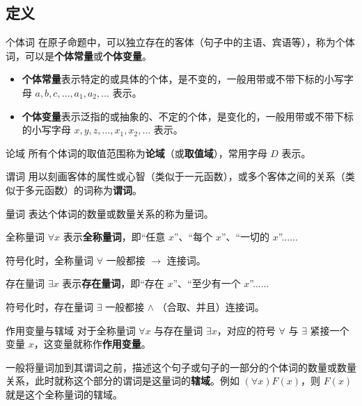 

\subsection{定义}
\begin{definition}{个体词}
在原子命题中，可以独立存在的客体（句子中的主语、宾语等），称为个体词，可以是\textbf{个体常量}或\textbf{个体变量}。
\begin{itemize}
\item \textbf{个体常量}表示特定的或具体的个体，是不变的，一般用带或不带下标的小写字母 $a, b, c, \dots, a_1, a_2, \dots$ 表示。
\item \textbf{个体变量}表示泛指的或抽象的、不定的个体，是变化的，一般用带或不带下标的小写字母 $x, y, z, \dots, x_1, x_2, \dots$ 表示。
\end{itemize}

\end{definition}
\begin{definition}{论域}
所有个体词的取值范围称为\textbf{论域}（或\textbf{取值域}），常用字母 $D$ 表示。
\end{definition}


\begin{definition}{谓词}
用以刻画客体的属性或心智（类似于一元函数），或多个客体之间的关系（类似于多元函数）的词称为\textbf{谓词}。
\end{definition}

\begin{definition}{量词}
表达个体词的数量或数量关系的称为量词。
\end{definition}

\begin{definition}{全称量词}
$\forall x$ 表示\textbf{全称量词}，即“任意 $x$”、“每个 $x$”、“一切的 $x$”......

符号化时，全称量词 $\forall$ 一般都接 $\to$ 连接词。
\end{definition}
\begin{definition}{存在量词}
$\exists x$ 表示\textbf{存在量词}，即“存在 $x$”、“至少有一个 $x$”......

符号化时，存在量词 $\exists$ 一般都接 $\land$ （合取、并且）连接词。
\end{definition}

\begin{definition}{作用变量与辖域}
对于全称量词 $\forall x$ 与存在量词 $\exists x$，对应的符号 $\forall$ 与 $\exists$ 紧接一个变量 $x$，这变量就称作\textbf{作用变量}。

一般将量词加到其谓词之前，描述这个句子或句子的一部分的个体词的数量或数量关系，此时就称这个部分的谓词是这量词的\textbf{辖域}。例如 $(\forall x) F(x)$，则 $F(x)$ 就是这个全称量词的辖域。
\end{definition}



